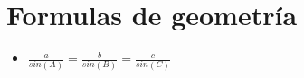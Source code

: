 \section{Formulas de geometría}
\begin{itemize}
\item $\frac{a}{sin(A)}=\frac{b}{sin(B)}=\frac{c}{sin(C)}$
\end{itemize}
